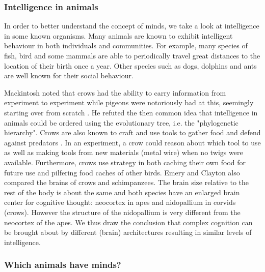\documentclass[11pt]{article}
\newenvironment{draft}{\color{dark-cornflower-blue-2}}{\ignorespacesafterend}
\begin{document}
\subsubsection*{Intelligence in animals}

\begin{draft}

In order to better understand the concept of minds, we take a look at intelligence in some known organisms. 
Many animals are known to exhibit intelligent behaviour in both individuals and communities. For example, many species of fish, bird and some mammals are able to periodically travel great distances to the location of their birth once a year. Other species such as dogs, dolphins and ants are well known for their social behaviour.

Mackintosh noted that crows had the ability to carry information from experiment to experiment while pigeons were notoriously bad at this, seemingly starting over from scratch \cite{mackintosh1988animals}. He refuted the then common idea that intelligence in animals could be ordered using the evolutionary tree, i.e. the "phylogenetic hierarchy". 
Crows are also known to craft and use tools to gather food and defend against predators \cite{emery2004crows}. In an experiment, a crow could reason about which tool to use as well as making tools from new materials (metal wire) when no twigs were available.
Furthermore, crows use strategy in both caching their own food for future use and pilfering food caches of other birds. 
Emery and Clayton also compared the brains of crows and schimpanzees.
The brain size relative to the rest of the body is about the same and both species have an enlarged brain center for cognitive thought: neocortex in apes and nidopallium in corvids (crows). However the structure of the nidopallium is very different from the neocortex of the apes. We thus draw the conclusion that complex cognition can be brought about by different (brain) architectures resulting in similar levels of intelligence.

\subsubsection*{Which animals have minds?}


\end{draft}
\end{document}
